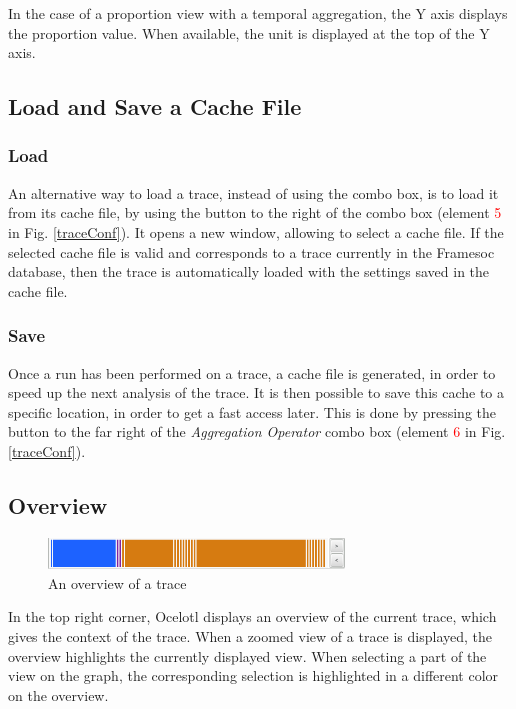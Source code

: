 \documentclass[twoside]{article}
\begin{document}
\begin{sloppypar}
In the case of a proportion view with a temporal aggregation, the Y axis displays the proportion value. When available, the unit is displayed at the top of the Y axis.

\subsection{Load and Save a Cache File}
\subsubsection{Load}
An alternative way to load a trace, instead of using the combo box, is to load it from its cache file, by using the button to the right of the combo box (element \textcolor{red}{5} in Fig. \ref{traceConf}). It opens a new window, allowing to select a cache file. If the selected cache file is valid and corresponds to a trace currently in the Framesoc database, then the trace is automatically loaded with the settings saved in the cache file.

\subsubsection{Save}
Once a run has been performed on a trace, a cache file is generated, in order to speed up the next analysis of the trace. It is then possible to save this cache to a specific location, in order to get a fast access later. This is done by pressing the button to the far right of the \textit{Aggregation Operator} combo box (element \textcolor{red}{6} in Fig. \ref{traceConf}).

\subsection{Overview}
\begin{figure}[h!]
	\centering
	\includegraphics[width=0.7\textwidth]{images/overview.png}
	\caption{An overview of a trace}
	\label{overview}
\end{figure}
In the top right corner, Ocelotl displays an overview of the current trace, which gives the context of the trace. When a zoomed view of a trace is displayed, the overview highlights the currently displayed view. When selecting a part of the view on the graph, the corresponding selection is highlighted in a different color on the overview.


\end{sloppypar}
\end{document}

